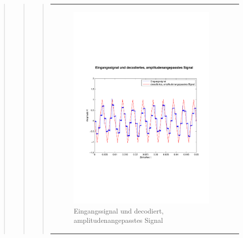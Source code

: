 \begin{quote}
\begin{quote}
\begin{quote}
\begin{center}
\begin{tabular}{ll}
                \hspace{-4cm}
                    \begin{minipage}{0.6\textwidth}
                        \begin{figure}[H]
                            \includegraphics[scale=0.4, trim = 0cm 7cm 0cm
                            7.5cm, clip]
                            {./Bilder/drei8_Eingang_vs_DecodiertAmpl-angepasst}
                              \caption{Eingangssignal und decodiert, \newline
                              amplitudenangepasstes Signal}
                        \end{figure}
                    \end{minipage}
                    

\end{tabular}
\end{center}
\end{quote}
\end{quote}
\end{quote}
